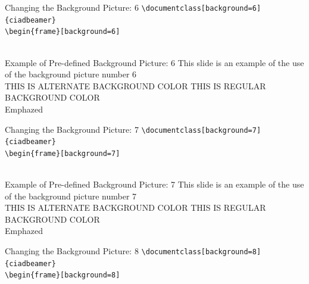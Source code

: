 \documentclass[english,sectioncirclenumberstyle]{ciadbeamer}
\begin{document}
\begin{frame}[t]{{Changing the Background Picture:} 6}
	\texttt{{\textbackslash}documentclass[background=6]\{ciadbeamer\}} \\[.25cm]
	\texttt{{\textbackslash}begin\{frame\}[background=6]} \\[.25cm]
	\centering{} \\[.25cm]
\end{frame}

\begin{frame}[background=6]{Example of Pre-defined Background Picture: 6}
	This slide is an example of the use of the background picture number 6 \\[.5cm]
	\ifbeamerthemeciadalternatebgcolor%
		THIS IS ALTERNATE BACKGROUND COLOR%
	\else%
		THIS IS REGULAR BACKGROUND COLOR%
	\fi\\[.5cm]%
	Emphazed 
\end{frame}

\begin{frame}[t]{{Changing the Background Picture:} 7}
	\texttt{{\textbackslash}documentclass[background=7]\{ciadbeamer\}} \\[.25cm]
	\texttt{{\textbackslash}begin\{frame\}[background=7]} \\[.25cm]
	\centering{} \\[.25cm]
\end{frame}

\begin{frame}[background=7]{Example of Pre-defined Background Picture: 7}
	This slide is an example of the use of the background picture number 7 \\[.5cm]
	\ifbeamerthemeciadalternatebgcolor%
		THIS IS ALTERNATE BACKGROUND COLOR%
	\else%
		THIS IS REGULAR BACKGROUND COLOR%
	\fi\\[.5cm]%
	Emphazed 
\end{frame}

\begin{frame}[t]{{Changing the Background Picture:} 8}
	\texttt{{\textbackslash}documentclass[background=8]\{ciadbeamer\}} \\[.25cm]
	\texttt{{\textbackslash}begin\{frame\}[background=8]} \\[.25cm]
	\centering{} \\[.25cm]
\end{frame}
\end{document}
